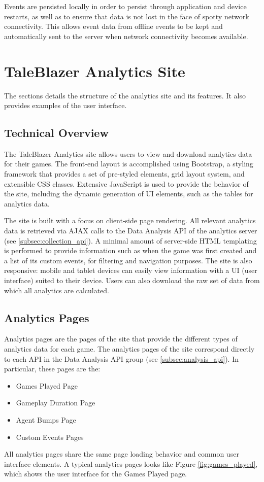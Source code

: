 Events are persisted locally in order to persist through application and device restarts, as well as to ensure that data is not lost in the face of spotty network connectivity. This allows event data from offline events to be kept and automatically sent to the server when network connectivity becomes available.

\section{TaleBlazer Analytics Site}

The sections details the structure of the analytics site and its features. It also provides examples of the user interface. 

\subsection{Technical Overview}

The TaleBlazer Analytics site allows users to view and download analytics data for their games. The front-end layout is accomplished using Bootstrap, a styling framework that provides a set of pre-styled elements, grid layout system, and extensible CSS classes. Extensive JavaScript is used to provide the behavior of the site, including the dynamic generation of UI elements, such as the tables for analytics data. 

The site is built with a focus on client-side page rendering. All relevant analytics data is retrieved via AJAX calls to the Data Analysis API of the analytics server (see \ref{subsec:collection_api}). A minimal amount of server-side HTML templating is performed to provide information such as when the game was first created and a list of its custom events, for filtering and navigation purposes. The site is also responsive: mobile and tablet devices can easily view information with a UI (user interface) suited to their device. Users can also download the raw set of data from which all analytics are calculated.

\subsection{Analytics Pages}

Analytics pages are the pages of the site that provide the different types of analytics data for each game. The analytics pages of the site correspond directly to each API in the Data Analysis API group (see \ref{subsec:analysis_api}). In particular, these pages are the:
	\begin{itemize}
		\item Games Played Page
		\item Gameplay Duration Page
		\item Agent Bumps Page
		\item Custom Events Pages
	\end{itemize}
All analytics pages share the same page loading behavior and common user interface elements. A typical analytics pages looks like Figure \ref{fig:games_played}, which shows the user interface for the Games Played page.

